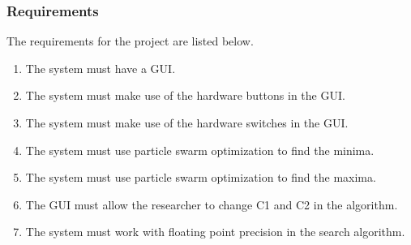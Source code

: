 \subsubsection{Requirements}
The requirements for the project are listed below.
\begin{enumerate}
	\item The system must have a GUI.
	\item The system must make use of the hardware buttons in the GUI.
	\item The system must make use of the hardware switches in the GUI.
	\item The system must use particle swarm optimization to find the minima.
	\item The system must use particle swarm optimization to find the maxima.
	\item The GUI must allow the researcher to change C1 and C2 in the algorithm.
	\item The system must work with floating point precision in the search algorithm.
\end{enumerate}